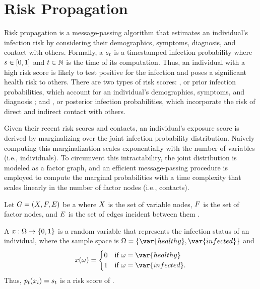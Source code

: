 \chapter{Risk Propagation}\label{ch:risk-propagation}

Risk propagation is a message-passing algorithm that estimates an individual's infection risk by considering their demographics, symptoms, diagnosis, and contact with others. Formally, a  $s_t$ is a timestamped infection probability where $s \in [0, 1]$ and $t \in \mathbb{N}$ is the time of its computation. Thus, an individual with a high risk score is likely to test positive for the infection and poses a significant health risk to others. There are two types of risk scores: , or prior infection probabilities, which account for an individual's demographics, symptoms, and diagnosis \citep{Menni2020}; and , or posterior infection probabilities, which incorporate the risk of direct and indirect contact with others.

Given their recent risk scores and contacts, an individual's exposure score is derived by marginalizing over the joint infection probability distribution. Naively computing this marginalization scales exponentially with the number of variables (i.e., individuals). To circumvent this intractability, the joint distribution is modeled as a factor graph, and an efficient message-passing procedure is employed to compute the marginal probabilities with a time complexity that scales linearly in the number of factor nodes (i.e., contacts).

Let $G = (X, F, E)$ be a  where $X$ is the set of variable nodes, $F$ is the set of factor nodes, and $E$ is the set of edges incident between them \citep{Kschischang2001}. 

A  $\vVariable: \eventSpace \rightarrow \{0, 1\} $ is a random variable that represents the infection status of an individual, where the sample space is $\eventSpace = \{\var{healthy}, \var{infected}\}$ and
\begin{equation*}
  \vVariable(\event) =
    \begin{cases}
      0 & \text{if } \event = \var{healthy} \\
      1 & \text{if } \event = \var{infected}.
    \end{cases}
\end{equation*}
Thus, $\pr{\vVariable[i]}[t] = \vScore_t$ is a risk score of .


